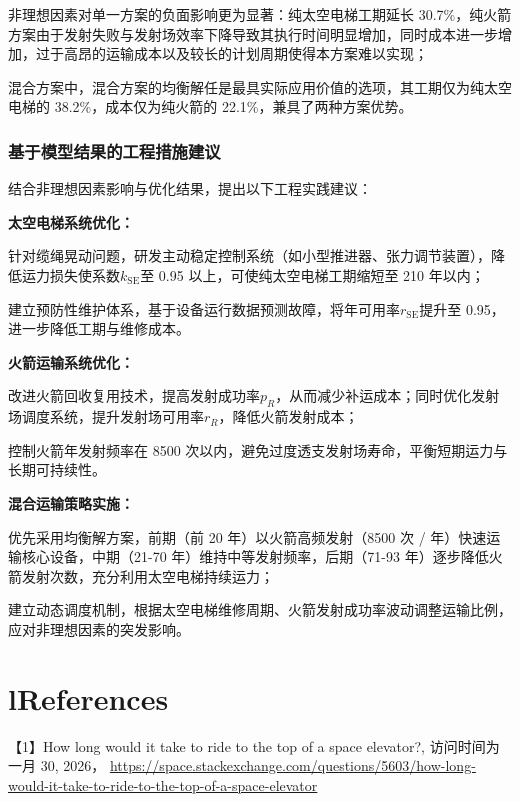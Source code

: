 非理想因素对单一方案的负面影响更为显著：纯太空电梯工期延长
30.7\%，纯火箭方案由于发射失败与发射场效率下降导致其执行时间明显增加，同时成本进一步增加，过于高昂的运输成本以及较长的计划周期使得本方案难以实现；

混合方案中，混合方案的均衡解任是最具实际应用价值的选项，其工期仅为纯太空电梯的
38.2\%，成本仅为纯火箭的 22.1\%，兼具了两种方案优势。

\hypertarget{ux57faux4e8eux6a21ux578bux7ed3ux679cux7684ux5de5ux7a0bux63aaux65bdux5efaux8bae}{%
\subsubsection{基于模型结果的工程措施建议}\label{ux57faux4e8eux6a21ux578bux7ed3ux679cux7684ux5de5ux7a0bux63aaux65bdux5efaux8bae}}

结合非理想因素影响与优化结果，提出以下工程实践建议：

\textbf{太空电梯系统优化：}

针对缆绳晃动问题，研发主动稳定控制系统（如小型推进器、张力调节装置），降低运力损失使系数\(k_{\text{SE}}\)至
0.95 以上，可使纯太空电梯工期缩短至 210 年以内；

建立预防性维护体系，基于设备运行数据预测故障，将年可用率\(r_{\text{SE}}\)提升至
0.95，进一步降低工期与维修成本。

\textbf{火箭运输系统优化：}

改进火箭回收复用技术，提高发射成功率\(p_{R}\)，从而减少补运成本；同时优化发射场调度系统，提升发射场可用率\(r_{R}\)，降低火箭发射成本；

控制火箭年发射频率在 8500
次以内，避免过度透支发射场寿命，平衡短期运力与长期可持续性。

\textbf{混合运输策略实施：}

优先采用均衡解方案，前期（前 20 年）以火箭高频发射（8500 次 /
年）快速运输核心设备，中期（21-70 年）维持中等发射频率，后期（71-93
年）逐步降低火箭发射次数，充分利用太空电梯持续运力；

建立动态调度机制，根据太空电梯维修周期、火箭发射成功率波动调整运输比例，应对非理想因素的突发影响。

\hypertarget{lreferences}{%
\section{lReferences}\label{lreferences}}

【1】How long would it take to ride to the top of a space elevator?,
访问时间为 一月 30, 2026，
\underline{https://space.stackexchange.com/questions/5603/how-long-would-it-take-to-ride-to-the-top-of-a-space-elevator}

